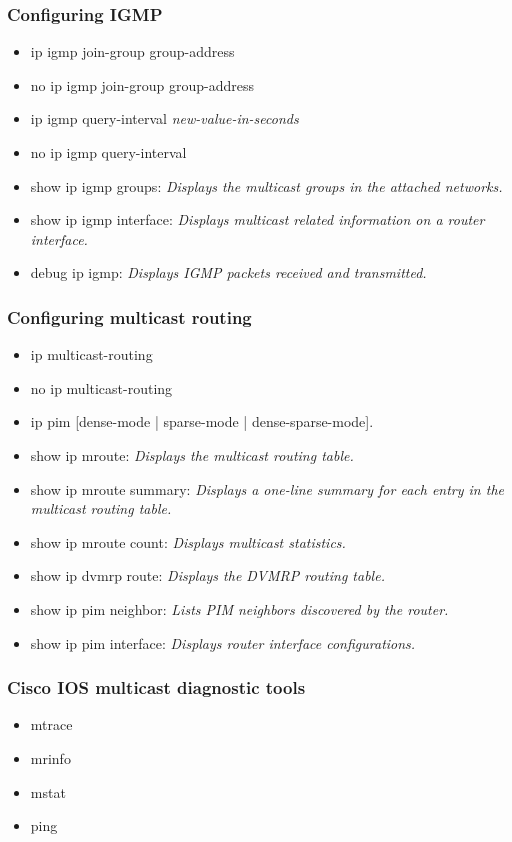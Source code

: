 \documentclass[10pt,a4paper]{article}
\numberwithin{equation}{section}
\numberwithin{figure}{section}
\numberwithin{table}{section}
\begin{document}
\subsubsection{Configuring IGMP}
\begin{itemize}
    \item ip igmp join-group group-address
    \item no ip igmp join-group group-address
    \item ip igmp query-interval \textit{new-value-in-seconds}
    \item no ip igmp query-interval
    \item show ip igmp groups: \textit{Displays the multicast groups in the attached
    networks.}
    \item show ip igmp interface: \textit{Displays multicast related information on a
    router interface.}
    \item debug ip igmp: \textit{Displays IGMP packets received and transmitted.}
\end{itemize}

\subsubsection{Configuring multicast routing}
\begin{itemize}
    \item ip multicast-routing
    \item no ip multicast-routing
    \item ip pim [dense-mode | sparse-mode | dense-sparse-mode].
    \item show ip mroute: \textit{Displays the multicast routing table.}
    \item show ip mroute summary: \textit{Displays a one-line summary for each entry in the multicast routing table.}
    \item show ip mroute count: \textit{Displays multicast statistics.}
    \item show ip dvmrp route: \textit{Displays the DVMRP routing table.}
    \item show ip pim neighbor: \textit{Lists PIM neighbors discovered by the router.}
    \item show ip pim interface: \textit{Displays router interface configurations.}
\end{itemize}

\subsubsection{Cisco IOS multicast diagnostic tools}
\begin{itemize}
    \item mtrace
    \item mrinfo
    \item mstat
    \item ping
\end{itemize}
\end{document}
